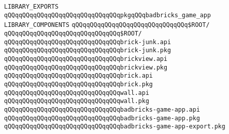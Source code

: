 \label{src/lib/x-kit/tut/badbricks-game/badbricks-game-app.lib}
\verb|LIBRARY_EXPORTS|\newline
\newline
\verb|qQQqqQQqqQQqqQQqqQQqqQQqqQQqqQQqpkgqQQqbadbricks_game_app|\newline
\newline
\verb|LIBRARY_COMPONENTS|\newline
\newline
\verb|qQQqqQQqqQQqqQQqqQQqqQQqqQQqqQQq$ROOT/|\newline
\verb|qQQqqQQqqQQqqQQqqQQqqQQqqQQqqQQq$ROOT/|\newline
\newline
\verb|qQQqqQQqqQQqqQQqqQQqqQQqqQQqqQQqbrick-junk.api|\newline
\verb|qQQqqQQqqQQqqQQqqQQqqQQqqQQqqQQqbrick-junk.pkg|\newline
\newline
\verb|qQQqqQQqqQQqqQQqqQQqqQQqqQQqqQQqbrickview.api|\newline
\verb|qQQqqQQqqQQqqQQqqQQqqQQqqQQqqQQqbrickview.pkg|\newline
\newline
\verb|qQQqqQQqqQQqqQQqqQQqqQQqqQQqqQQqbrick.api|\newline
\verb|qQQqqQQqqQQqqQQqqQQqqQQqqQQqqQQqbrick.pkg|\newline
\newline
\verb|qQQqqQQqqQQqqQQqqQQqqQQqqQQqqQQqwall.api|\newline
\verb|qQQqqQQqqQQqqQQqqQQqqQQqqQQqqQQqwall.pkg|\newline
\newline
\verb|qQQqqQQqqQQqqQQqqQQqqQQqqQQqqQQqbadbricks-game-app.api|\newline
\verb|qQQqqQQqqQQqqQQqqQQqqQQqqQQqqQQqbadbricks-game-app.pkg|\newline
\newline
\verb|qQQqqQQqqQQqqQQqqQQqqQQqqQQqqQQqbadbricks-game-app-export.pkg|\newline

